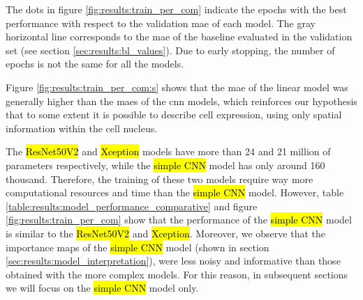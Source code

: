 The dots in figure \ref{fig:results:train_per_com} indicate the epochs with the best performance with respect to the validation \gls{mae} of each model.
The gray horizontal line corresponds to the \gls{mae} of the baseline evaluated in the validation set (see section \ref{sec:results:bl_values}). Due to early stopping, the number of epochs is not the same for all the models.

Figure \ref{fig:results:train_per_com:s} shows that the \gls{mae} of the linear model was generally higher than the \glspl{mae} of the \gls{cnn} models, which reinforces our hypothesis that to some extent it is possible to describe cell expression, using only spatial information within the cell nucleus.

The \hl{ResNet50V2} and \hl{Xception} models have more than 24 and 21 million of parameters respectively, while the \hl{simple CNN} model has only around 160 thousand. Therefore, the training of these two models require way more computational resources and time than the \hl{simple CNN} model.
However, table \ref{table:results:model_performance_comparative} and figure \ref{fig:results:train_per_com} show that the performance of the \hl{simple CNN} model is similar to the \hl{ResNet50V2} and \hl{Xception}.
Moreover, we observe that the importance maps of the \hl{simple CNN} model (shown in section \ref{sec:results:model_interpretation}), were less noisy and informative than those obtained with the more complex models. For this reason, in subsequent sections we will focus on the \hl{simple CNN} model only.

